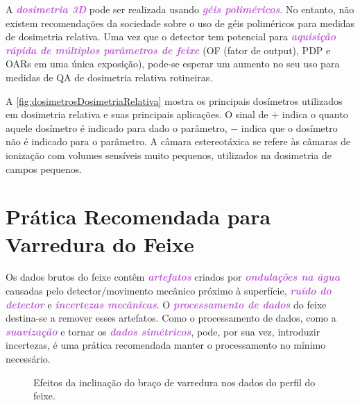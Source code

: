 \documentclass[11pt,a4paper]{article}
\begin{document}
	A \textcolor{MediumOrchid}{\textbf{\textit{dosimetria 3D}}} pode ser realizada usando \textcolor{MediumOrchid}{\textbf{\textit{géis poliméricos}}}. No entanto, não existem recomendações da sociedade sobre o uso de géis poliméricos para medidas de dosimetria relativa. Uma vez que o detector tem potencial para \textcolor{MediumOrchid}{\textbf{\textit{aquisição rápida de múltiplos parâmetros de feixe}}} (OF (fator de output), PDP e OARs  em uma única exposição), pode-se esperar um aumento no seu uso para medidas de QA de dosimetria relativa rotineiras.

	A \ref{fig:dosimetrosDosimetriaRelativa} mostra os principais dosímetros utilizados em dosimetria relativa e suas principais aplicações. O sinal de $+$ indica o quanto aquele dosímetro é indicado para dado o parâmetro, $-$ indica que o dosímetro não é indicado para o parâmetro. A câmara estereotáxica se refere às câmaras de ionização com volumes sensíveis muito pequenos, utilizados na dosimetria de campos pequenos.

	

\section{Prática Recomendada para Varredura do Feixe}

	Os dados brutos do feixe contêm \textcolor{MediumOrchid}{\textbf{\textit{artefatos}}} criados por \textcolor{MediumOrchid}{\textbf{\textit{ondulações na água}}} causadas pelo detector/movimento mecânico próximo à superfície, \textcolor{MediumOrchid}{\textbf{\textit{ruído do detector}}} e \textcolor{MediumOrchid}{\textbf{\textit{incertezas mecânicas}}}. O \textcolor{MediumOrchid}{\textbf{\textit{processamento de dados}}} do feixe destina-se a remover esses artefatos. Como o processamento de dados, como a \textcolor{MediumOrchid}{\textbf{\textit{suavização}}} e tornar os \textcolor{MediumOrchid}{\textbf{\textit{dados simétricos}}}, pode, por sua vez, introduzir incertezas, é uma prática recomendada manter o processamento no mínimo necessário.

	\begin{figure}
		\centering
		\caption{Efeitos da inclinação do braço de varredura nos dados do perfil do feixe.}
		\label{fig:scanningArmTilt}
	\end{figure}
\end{document}
